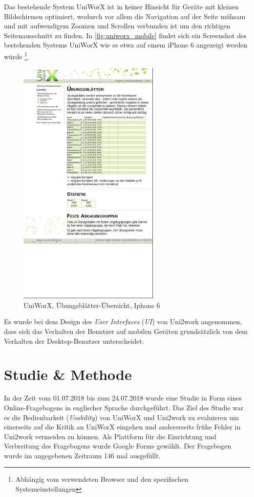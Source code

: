 \documentclass[11pt,a4paper,twoside,ngerman]{article}
\begin{document}
Das bestehende System UniWorX ist in keiner Hinsicht für Geräte mit kleinen Bildschirmen optimiert, wodurch vor allem die Navigation auf der Seite mühsam und mit aufwendigem Zoomen und Scrollen verbunden ist um den richtigen Seitenausschnitt zu finden. In \autoref{fig:uniworx_mobile} findet sich ein Screenshot des bestehenden Systems UniWorX wie es etwa auf einem iPhone 6 angezeigt werden würde \footnote{Abhängig vom verwendeten Browser und den spezifischen Systemeinstellungen}.

\begin{figure}
    \centering
    \includegraphics[width=7cm]{uniworx_mobile.png}
    \caption{UniWorX, Übungsblätter-Übersicht, Iphone 6}
    \label{fig:uniworx_mobile}
\end{figure}

Es wurde bei dem Design des \emph{User Interfaces} (\emph{UI}) von Uni2work angenommen, dass sich das Verhalten der Benutzer auf mobilen Geräten grundsätzlich von dem Verhalten der Desktop-Benutzer unterscheidet. 

\clearpage
\section{Studie \& Methode} \label{sec:userstudies}
In der Zeit vom 01.07.2018 bis zum 24.07.2018 wurde eine Studie in Form eines Online-Fragebogens in englischer Sprache durchgeführt.
Das Ziel des Studie war es die Bedienbarkeit (\emph{Usability}) von UniWorX und Uni2work zu evaluieren um einerseits auf die Kritik an UniWorX eingehen und andererseits frühe Fehler in Uni2work vermeiden zu können. Als Plattform für die Einrichtung und Verbreitung des Fragebogens wurde Google Forms gewählt. Der Fragebogen wurde im angegebenen Zeitraum 146 mal ausgefüllt.
\end{document}
